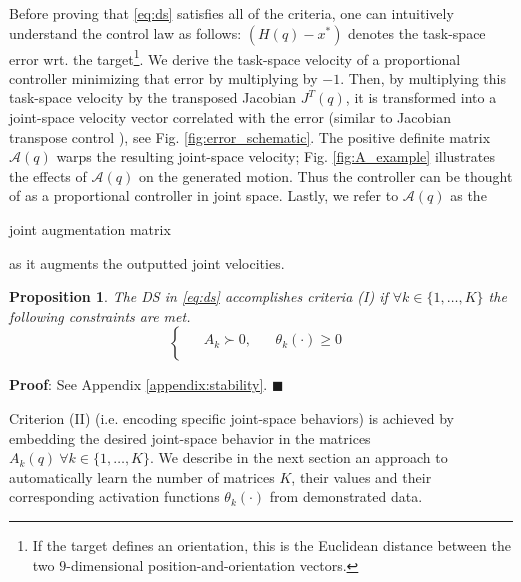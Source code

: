 \documentclass[letterpaper, 10 pt, journal, twoside, fleqn]{IEEEtran}
\begin{document}
Before proving that \eqref{eq:ds} satisfies all of the criteria, one can intuitively understand the control law as follows: $(H(q) - x^*)$ denotes the task-space error wrt. the target\footnote{If the target defines an orientation, this is the Euclidean distance between the two $9$-dimensional position-and-orientation vectors.}. We derive the task-space velocity of a proportional controller minimizing that error by multiplying by $-1$. Then, by multiplying this task-space velocity by the transposed Jacobian $J^T(q)$, it is transformed into a joint-space velocity vector correlated with the error (similar to Jacobian transpose control \cite{wolovich1984computational,sciavicco1988solution}), see Fig. \ref{fig:error_schematic}. The positive definite matrix $\mathcal{A}(q)$ warps the resulting joint-space velocity; Fig. \ref{fig:A_example} illustrates the effects of  $\mathcal{A}(q)$ on the generated motion. Thus the controller can be thought of as a proportional controller in joint space. Lastly, we refer to %
$\mathcal{A}(q)$ as the \begin{bf} joint augmentation matrix \end{bf} as it augments the outputted joint velocities.
\newtheorem{prop1}{Proposition}
\begin{prop1}
\label{prop:stability}
The DS in \eqref{eq:ds} accomplishes criteria (I) if $ \forall k \in \{1,\dots,K\}  $ the following constraints are met. 
\begin{equation}
\label{eq:first_criteria_stability}
\begin{cases}
\begin{split}
 & A_k \succ 0, & ~~~~ \theta_k(\cdot) \geq 0 \\
\end{split}
\end{cases}
\end{equation}    
\end{prop1}
\vspace{5pt}
\textbf{Proof}: See Appendix \ref{appendix:stability}. $\blacksquare$

Criterion (II) (i.e. encoding specific joint-space behaviors) is achieved by embedding the desired joint-space behavior in the matrices $A_k(q)~ \forall k \in\{1,\dots,K\}$. We describe in the next section an approach to automatically learn the number of matrices $K$, their values and their corresponding activation functions $\theta_k(\cdot)$ from demonstrated data. 
\end{document}
